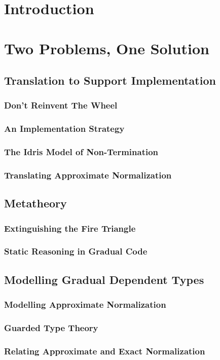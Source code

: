 
\section{Introduction}

\section{Two Problems, One Solution}


\subsection{Translation to Support Implementation}

\subsubsection{Don't Reinvent The Wheel}

\subsubsection{An Implementation Strategy}

\subsubsection{The Idris Model of Non-Termination}

\subsubsection{Translating Approximate Normalization}


\subsection{Metatheory}

\subsubsection{Extinguishing the Fire Triangle}

\subsubsection{Static Reasoning in Gradual Code}

\subsection{Modelling Gradual Dependent Types}


\subsubsection{Modelling Approximate Normalization}

\subsubsection{Guarded Type Theory}

\subsubsection{Relating Approximate and Exact Normalization}

